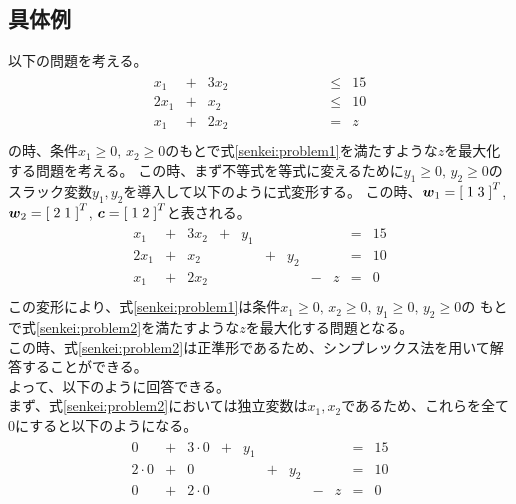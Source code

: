 \documentclass[dvipdfmx,titlepage, a4paper]{jsarticle}%
\begin{document}
\subsection{具体例}
以下の問題を考える。
\begin{eqnarray}
	\begin{array}{ccccccccccc}
		x_{1} & + & 3x_{2} & \; &\; & \;& \; &\; & \; & \leq & 15\\
		2x_{1} & + & x_{2} & \; &\; & \;& \; &\; & \; & \leq & 10\\
		x_{1} & + & 2x_{2} & \; &\; & \;& \; &\; & \; & = & z\\
	\end{array}\label{senkei:problem1}
\end{eqnarray}
の時、条件$x_{1} \geq 0, \, x_{2} \geq 0$のもとで式\eqref{senkei:problem1}を満たすような$z$を最大化する問題を考える。
この時、まず不等式を等式に変えるために$y_{1} \geq 0, \, y_{2} \geq 0$のスラック変数$y_{1}, y_{2}$を導入して以下のように式変形する。
この時、$\mbox{\boldmath $w$}_{1} = \left[ \; 1\; 3\; \right]^{T}$, $\mbox{\boldmath $w$}_{2} = \left[\; 2\; 1\; \right]^{T}$,
$\mbox{\boldmath $c$} = \left[\; 1\; 2\; \right]^{T}$と表される。
\begin{eqnarray}
	\begin{array}{ccccccccccc}
		x_{1} & + & 3x_{2} & + & y_{1} & \;& \; &\; & \; & = & 15\\
		2x_{1} & + & x_{2} & \; &\; & + & y_{2} &\; & \; & = & 10\\
		x_{1} & + & 2x_{2} & \; &\; & \;& \; & - & z & = & 0\\
	\end{array}\label{senkei:problem2}
\end{eqnarray}
この変形により、式\eqref{senkei:problem1}は条件$x_{1} \geq 0, \, x_{2} \geq 0, \, y_{1} \geq 0, \, y_{2} \geq 0$の
もとで式\eqref{senkei:problem2}を満たすような$z$を最大化する問題となる。\\
この時、式\eqref{senkei:problem2}は正準形であるため、シンプレックス法を用いて解答することができる。\\
よって、以下のように回答できる。\\
まず、式\eqref{senkei:problem2}においては独立変数は$x_{1}, x_{2}$であるため、これらを全て0にすると以下のようになる。
\begin{eqnarray*}
	\begin{array}{lllllllllll}
		0 & + & 3 \cdot 0 & + & y_{1} & \;& \; &\; & \; & = & 15\\
		2 \cdot 0 & + & 0 & \; &\; & + & y_{2} &\; & \; & = & 10\\
		0 & + & 2 \cdot 0 & \; &\; & \;& \; & - & z & = & 0\\
	\end{array}
\end{eqnarray*}
\end{document}

